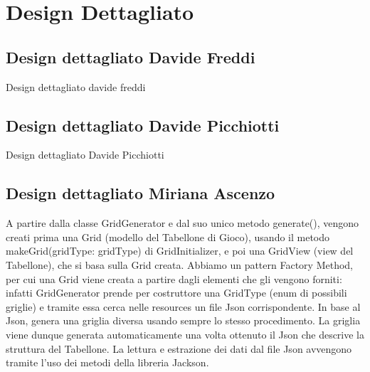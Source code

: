 \documentclass[a4paper,12pt]{report}
\begin{document}
\section{Design Dettagliato}

\subsection{Design dettagliato Davide Freddi}
Design dettagliato davide freddi

\subsection{Design dettagliato Davide Picchiotti}
Design dettagliato Davide Picchiotti

\subsection{Design dettagliato Miriana Ascenzo}

A partire dalla classe GridGenerator e dal suo unico metodo generate(), vengono creati prima una Grid (modello del Tabellone di Gioco), usando il metodo makeGrid(gridType: gridType) di GridInitializer, e poi una GridView (view del Tabellone), che si basa sulla Grid creata.
%
Abbiamo un pattern Factory Method, per cui una Grid viene creata a partire dagli elementi che gli vengono forniti: infatti GridGenerator prende per costruttore una GridType (enum di possibili griglie) e tramite essa cerca nelle resources un file Json corrispondente.
%
In base al Json, genera una griglia diversa usando sempre lo stesso procedimento.
%
La griglia viene dunque generata automaticamente una volta ottenuto il Json che descrive la struttura del Tabellone.
%
La lettura e estrazione dei dati dal file Json avvengono tramite l’uso dei metodi della libreria Jackson.
\end{document}
